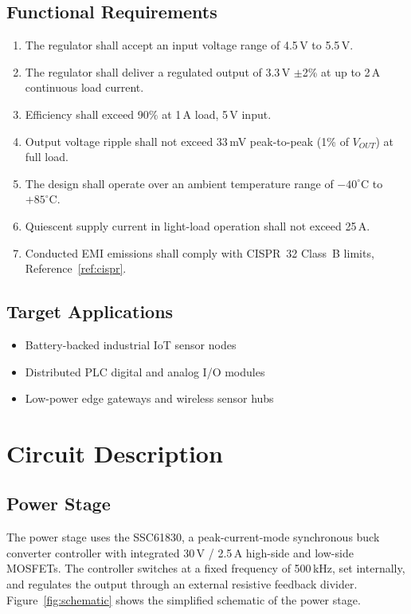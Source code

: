 \documentclass[11pt,a4paper]{article}
\begin{document}
\subsection{Functional Requirements}
\begin{enumerate}[label=\textbf{REQ-\arabic*:},leftmargin=2.4cm,itemsep=4pt,topsep=4pt]
\item The regulator shall accept an input voltage range of 4.5\,V to 5.5\,V.
\item The regulator shall deliver a regulated output of 3.3\,V $\pm$2\% at up
      to 2\,A continuous load current.
\item Efficiency shall exceed 90\% at 1\,A load, 5\,V input.
\item Output voltage ripple shall not exceed 33\,mV peak-to-peak (1\% of
      $V_{OUT}$) at full load.
\item The design shall operate over an ambient temperature range of
      $-40^\circ$C to $+85^\circ$C.
\item Quiescent supply current in light-load operation shall not exceed
      25\,\textmu A.
\item Conducted EMI emissions shall comply with CISPR~32 Class~B
      limits, Reference~\ref{ref:cispr}.
\end{enumerate}

\subsection{Target Applications}
\begin{itemize}[leftmargin=1.3em,itemsep=2pt]
\item Battery-backed industrial IoT sensor nodes
\item Distributed PLC digital and analog I/O modules
\item Low-power edge gateways and wireless sensor hubs
\end{itemize}

\section{Circuit Description}

\subsection{Power Stage}
The power stage uses the SSC61830, a peak-current-mode synchronous buck
converter controller with integrated 30\,V / 2.5\,A high-side and low-side
MOSFETs. The controller switches at a fixed frequency of 500\,kHz, set
internally, and regulates the output through an external resistive feedback
divider. Figure~\ref{fig:schematic} shows the simplified schematic of the
power stage.
\end{document}
